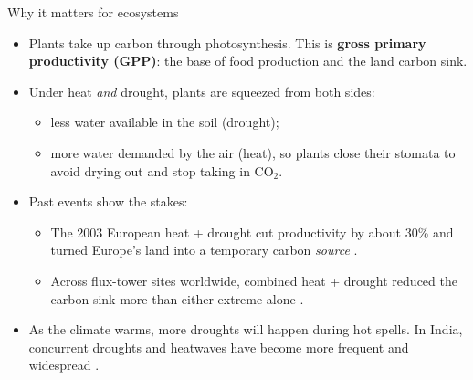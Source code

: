 \documentclass[11pt,aspectratio=169]{beamer}
\begin{document}
\begin{frame}{Why it matters for ecosystems}
  \small
  \begin{itemize}
    \item Plants take up carbon through photosynthesis. This is \textbf{gross
      primary productivity (GPP)}: the base of food production and the land
      carbon sink.
    \item Under heat \emph{and} drought, plants are squeezed from both sides:
      \begin{itemize}
        \item less water available in the soil (drought);
        \item more water demanded by the air (heat), so plants close their
          stomata to avoid drying out and stop taking in CO$_2$.
      \end{itemize}
    \item Past events show the stakes:
      \begin{itemize}
        \item The 2003 European heat + drought cut productivity by about
          30\% and turned Europe's land into a temporary carbon
          \emph{source} \citep{ciais2005}.
        \item Across flux-tower sites worldwide, combined heat + drought reduced the
          carbon sink more than either extreme alone \citep{vonbuttlar2018}.
      \end{itemize}
    \item As the climate warms, more droughts will happen during hot
      spells. In India, concurrent droughts and heatwaves have become more
      frequent and widespread \citep{sharma2017}.
  \end{itemize}
\end{frame}
\end{document}
